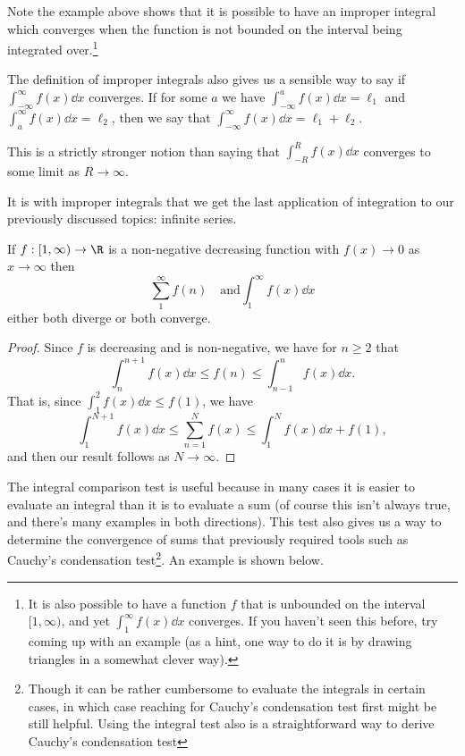 Note the example above shows that it is possible to have an improper integral which converges when the function is not bounded on the interval being integrated over.\footnote{It is also possible to have a function $f$ that is unbounded on the interval $[1, \infty)$, and yet $\int_1^{\infty} f(x) \dd x$ converges. If you haven't seen this before, try coming up with an example (as a hint, one way to do it is by drawing triangles in a somewhat clever way).} 

The definition of improper integrals also gives us a sensible way to say if $\int_{-\infty}^{\infty} f(x) \dd x$ converges. If for some $a$ we have $\int_{-\infty}^{a} f(x) \dd x = \ell_1$ and $\int_{a}^{\infty} f(x) \dd x = \ell_2$, then we say that $\int_{-\infty}^{\infty} f(x) \dd x = \ell_1 + \ell_2$.

\begin{remark}[Warning]
	This is a strictly stronger notion than saying that $\int_{-R}^{R} f(x) \dd x$ converges to some limit as $R \rightarrow \infty$.
\end{remark}

It is with improper integrals that we get the last application of integration to our previously discussed topics: infinite series. 

\begin{theorem}
	If $f:[1, \infty) \rightarrow \R$ is a non-negative decreasing function with $f(x) \rightarrow 0$ as $x \rightarrow \infty$ then
	$$
	\sum_1^{\infty} f(n) \quad \text{and} \int_1^{\infty} f(x) \dd x
	$$
	either both diverge or both converge.
\end{theorem}
\begin{proof}
	Since $f$ is decreasing and is non-negative, we have for $n \geq 2$ that
	$$
	\int_n^{n + 1} f(x) \dd x \leq f(n) \leq \int_{n - 1}^n f(x) \dd x.
	$$
	That is, since $\int_1^2 f(x) \dd x \leq f(1)$, we have
	$$
	\int_1^{N + 1} f(x) \dd x \leq \sum_{n= 1}^N f(x) \leq \int_1^N f(x) \dd x + f(1),
	$$
	and then our result follows as $N \rightarrow \infty$.
\end{proof}

The integral comparison test is useful because in many cases it is easier to evaluate an integral than it is to evaluate a sum (of course this isn't always true, and there's many examples in both directions). This test also gives us a way to determine the convergence of sums that previously required tools such as Cauchy's condensation test\footnote{Though it can be rather cumbersome to evaluate the integrals in certain cases, in which case reaching for Cauchy's condensation test first might be still helpful. Using the integral test also is a straightforward way to derive Cauchy's condensation test}. An example is shown below.


